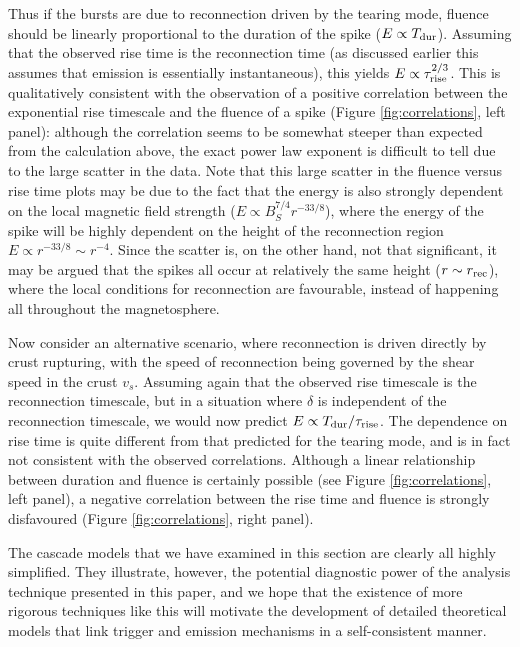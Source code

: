 \documentclass[12pt]{emulateapj}
\begin{document}
Thus if the bursts are due to reconnection driven by the tearing mode, fluence should be linearly proportional to the duration of the spike ($E\propto T_{\rm dur}$).  
Assuming that the observed rise time is the reconnection time (as discussed earlier this assumes that emission is essentially instantaneous), this 
yields $E\propto\tau_{\rm rise}^{2/3}$.  This is qualitatively consistent with the observation of a positive correlation between the exponential rise timescale
 and the fluence of a spike (Figure \ref{fig:correlations}, left panel): although the correlation seems to be somewhat steeper than expected from the calculation 
 above, the exact power law exponent is difficult to tell due to the large scatter in the data.   Note that this large scatter in the fluence versus rise time plots 
 may be due to the fact that the energy is also strongly dependent on the local magnetic field strength ($E\propto B_S^{7/4}r^{-33/8}$), where the energy of 
 the spike will be highly dependent on the height of the reconnection region $E\propto r^{-33/8}\sim r^{-4}$. Since the scatter is, on the other hand, not that
  significant, it may be argued that the spikes all occur at relatively the same height ($r\sim r_{\rm rec}$), where the local conditions for reconnection are 
  favourable, instead of happening all throughout the magnetosphere.

Now consider an alternative scenario, where reconnection is driven directly by crust rupturing, with the speed of reconnection being governed by the 
shear speed in the crust $v_s$.  Assuming again that the observed rise timescale is the reconnection timescale, but in a situation where $\delta$ is 
independent of the reconnection timescale, we would now predict $E \propto T_\mathrm{dur}/\tau_{\rm rise}$.  The dependence on rise time is quite 
different from that predicted for the tearing mode, and is in fact not consistent with the observed correlations.  Although a linear relationship between 
duration and fluence is certainly possible (see Figure \ref{fig:correlations}, left panel), a negative correlation between the rise time and fluence is strongly 
disfavoured (Figure \ref{fig:correlations}, right panel).

The cascade models that we have examined in this section are clearly all highly simplified.  They illustrate, however, the potential diagnostic power of 
the analysis technique presented in this paper, and we hope that the existence of more rigorous techniques like this will motivate the development of 
detailed theoretical models that link trigger and emission mechanisms in a self-consistent manner.  
\end{document}

